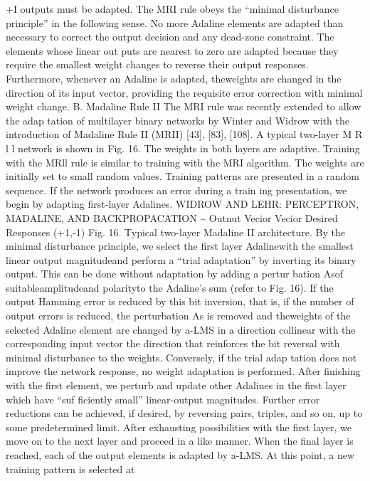 \documentclass[11pt,a4paper,twocolumn]{article}
\begin{document}
{+I outputs must be adapted. 
The MRI rule obeys the “minimal disturbance principle” 
in the following sense. No more Adaline elements are 
adapted than necessary to correct the output decision and 
any dead-zone constraint. The elements whose linear out
puts are nearest to zero are adapted because they require 
the smallest weight changes to reverse their output 
responses. Furthermore, whenever an Adaline is adapted, 
theweights are changed in the direction of its input vector, 
providing the requisite error correction with minimal 
weight change. 
B. Madaline Rule II 
The MRI rule was recently extended to allow the adap
tation of multilayer binary networks by Winter and Widrow 
with the introduction of Madaline Rule II (MRII) [43], [83], 
[108]. A typical two-layer M R l l  network is shown in Fig. 16. 
The weights in both layers are adaptive. 
Training with the MRll rule is similar to training with the 
MRI algorithm. The weights are initially set to small random 
values. Training patterns are presented in a random 
sequence. If the network produces an error during a train
ing presentation, we begin by adapting first-layer Adalines. 
WIDROW AND LEHR: PERCEPTRON, MADALINE, AND BACKPROPACATION 
\~{} 
Outnut 
Vecior 
Vecior 
Desired Responses 
(+1,-1) 
Fig. 16. Typical two-layer Madaline II architecture. 
By the minimal disturbance principle, we select the first
layer Adalinewith the smallest linear output magnitudeand 
perform a “trial adaptation” by inverting its binary output. 
This can be done without adaptation by adding a pertur
bation Asof suitableamplitudeand polarityto the Adaline’s 
sum (refer to Fig. 16). If the output Hamming error is reduced 
by this bit inversion, that is, if the number of output errors 
is reduced, the perturbation As is removed and theweights 
of the selected Adaline element are changed by a-LMS in 
a direction collinear with the corresponding input vector
the direction that reinforces the bit reversal with minimal 
disturbance to the weights. Conversely, if the trial adap
tation does not improve the network response, no weight 
adaptation is performed. 
After finishing with the first element, we perturb and 
update other Adalines in the first layer which have “suf
ficiently small” linear-output magnitudes. Further error 
reductions can be achieved, if desired, by reversing pairs, 
triples, and so on, up to some predetermined limit. After 
exhausting possibilities with the first layer, we move on to 
the next layer and proceed in a like manner. When the final 
layer is reached, each of the output elements is adapted by 
a-LMS. At this point, a new training pattern is selected at 
}
\end{document}
